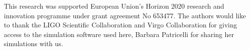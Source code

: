 \documentclass[11pt]{article}
\begin{document}
\vspace{10mm}


{\linespread{0.1} \footnotesize This research was supported European Union's
  Horizon 2020 research and innovation programme under grant agreement No
  653477. The authors would like to thank the LIGO Scientific Collaboration and
  Virgo Collaboration for giving access to the simulation software used here,
  Barbara Patricelli for sharing her simulations with us.}


{\footnotesize
}
\end{document}
